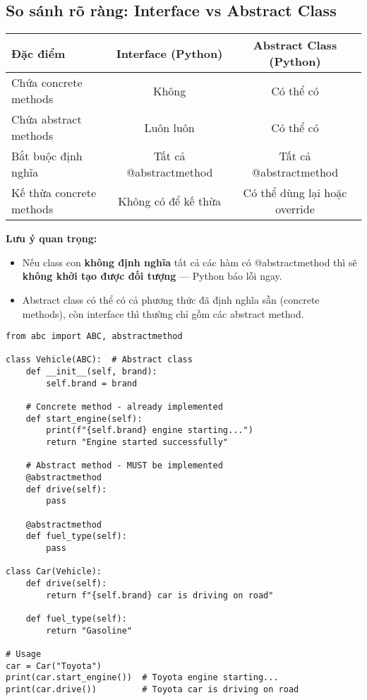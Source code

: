 \subsection{So sánh rõ ràng: Interface vs Abstract Class}
\begin{center}
\begin{tabular}{|l|c|c|}
\hline
\textbf{Đặc điểm} & \textbf{Interface (Python)} & \textbf{Abstract Class (Python)} \\
\hline
Chứa concrete methods & Không & Có thể có \\
Chứa abstract methods & Luôn luôn & Có thể có \\
Bắt buộc định nghĩa & Tất cả @abstractmethod & Tất cả @abstractmethod \\
Kế thừa concrete methods & Không có để kế thừa & Có thể dùng lại hoặc override \\
\hline
\end{tabular}
\end{center}

\textbf{Lưu ý quan trọng:}
\begin{itemize}
    \item Nếu class con \textbf{không định nghĩa} tất cả các hàm có @abstractmethod thì sẽ \textbf{không khởi tạo được đối tượng} --- Python báo lỗi ngay.
    \item Abstract class có thể có cả phương thức đã định nghĩa sẵn (concrete methods), còn interface thì thường chỉ gồm các abstract method.
\end{itemize}

\begin{lstlisting}[caption={Minh họa sự khác biệt Interface vs Abstract Class}]
from abc import ABC, abstractmethod

class Vehicle(ABC):  # Abstract class
    def __init__(self, brand):
        self.brand = brand
    
    # Concrete method - already implemented
    def start_engine(self):
        print(f"{self.brand} engine starting...")
        return "Engine started successfully"
    
    # Abstract method - MUST be implemented
    @abstractmethod
    def drive(self):
        pass
    
    @abstractmethod
    def fuel_type(self):
        pass

class Car(Vehicle):
    def drive(self):
        return f"{self.brand} car is driving on road"
    
    def fuel_type(self):
        return "Gasoline"

# Usage
car = Car("Toyota")
print(car.start_engine())  # Toyota engine starting...
print(car.drive())         # Toyota car is driving on road  
\end{lstlisting}

